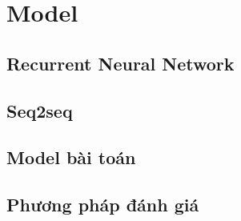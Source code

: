 %
\chapter{Model}
\label{sec:model}

\section{Recurrent Neural Network}
\label{sec:model:RNN}


\section{Seq2seq}
\label{sec:model:seq2seq}



\section{Model bài toán}
\label{sec:model:model}


\section{Phương pháp đánh giá}
\label{sec:model:evalution}
